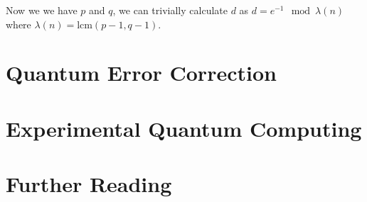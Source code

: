 \documentclass[reqno]{amsart}
\numberwithin{equation}{section}
\numberwithin{figure}{section}
\begin{document}
\begin{justify}
    Now we we have $p$ and $q$, we can trivially calculate $d$ as $d = e^{-1} \mod \lambda(n)$ where $\lambda(n) = \text{lcm}(p-1, q-1)$.
\end{justify}
\section{Quantum Error Correction}
\section{Experimental Quantum Computing}
\section{Further Reading}
\begin{justify}
\cite{Simon1997}
\end{justify}



\end{document}
